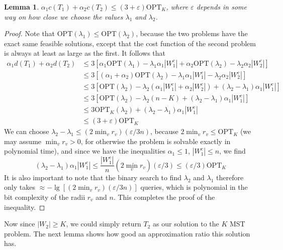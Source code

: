 \documentclass{article}
\theoremstyle{plain}
\newtheorem{lemma}{Lemma}
\theoremstyle{plain}
\begin{document}
\begin{lemma}
    $\alpha_1 c(T_1) + \alpha_2 c(T_2) \leq (3 + \varepsilon) \text{OPT}_K$, where $\varepsilon$ depends in some way on how close we choose the values $\lambda_1$ and $\lambda_2$.
\end{lemma}
\begin{proof}
    Note that $\text{OPT}(\lambda_1) \leq \text{OPT}(\lambda_2)$, because the two problems have the exact same feasible solutions, except that the cost function of the second problem is always at least as large as the first. It follows that
    \begin{align*}
        \alpha_1 d(T_1) + \alpha_2 d(T_2) &\leq 3[\alpha_1 \text{OPT}(\lambda_1) - \lambda_1 \alpha_1 |W_1^c| + \alpha_2 \text{OPT}(\lambda_2) - \lambda_2 \alpha_2 |W_2^c|]\\
        &\leq 3[(\alpha_1 + \alpha_2) \text{OPT}(\lambda_2) - \lambda_1 \alpha_1 |W_1^c| - \lambda_2 \alpha_2 |W_2^c|]\\
        &\leq 3[\text{OPT}(\lambda_2) - \lambda_2(\alpha_1 |W_1^c| + \alpha_2 |W_2^c|) + (\lambda_2 - \lambda_1) \alpha_1 |W_1^c|]\\
        &\leq 3[ \text{OPT}(\lambda_2) - \lambda_2(n-K) + (\lambda_2 - \lambda_1) \alpha_1 |W_1^c|]\\
        &\leq 3 \text{OPT}_K(\lambda_2) + (\lambda_2 - \lambda_1) \alpha_1 |W_1^c|\\
        &\leq (3 + \varepsilon) \text{OPT}_K
    \end{align*}
    We can choose $\lambda_2 - \lambda_1 \leq (2 \min_v r_v) (\varepsilon/3n)$, because $2 \min_v r_v \leq \text{OPT}_K$ (we may assume $\min_v r_v > 0$, for otherwise the problem is solvable exactly in polynomial time), and since we have the inequalities $\alpha_1 \leq 1$, $|W_1^c| \leq n$, we find
    \[ (\lambda_2 - \lambda_1) \alpha_1 |W_1^c| \leq \frac{|W_1^c|}{n} (2 \min_v r_v) (\varepsilon/3) \leq (\varepsilon/3) \text{OPT}_K \]
    It is also important to note that the binary search to find $\lambda_2$ and $\lambda_1$ therefore only takes $\approx -\lg[(2 \min_v r_v) (\varepsilon/3n)]$ queries, which is polynomial in the bit complexity of the radii $r_v$ and $n$. This completes the proof of the inequality.
\end{proof}

Now since $|W_2| \geq K$, we could simply return $T_2$ as our solution to the $K$ MST problem. The next lemma shows how good an approximation ratio this solution has.
\end{document}
